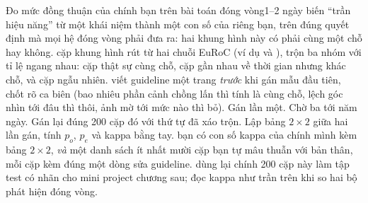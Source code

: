 \documentclass[../../deep_learning.tex]{subfiles}
\begin{document}
\begin{duan}{Đo mức đồng thuận của chính bạn trên bài toán đóng vòng}{1--2 ngày}
\dmt biến ``trần hiệu năng'' từ một khái niệm thành một con số của riêng bạn, trên đúng quyết định mà mọi hệ đóng vòng phải đưa ra: hai khung hình này có phải cùng một chỗ hay không.
 cặp khung hình rút từ hai chuỗi EuRoC (ví dụ  và ), trộn ba nhóm với tỉ lệ ngang nhau: cặp thật sự cùng chỗ, cặp gần nhau về thời gian nhưng khác chỗ, và cặp ngẫu nhiên.
\dbc viết guideline một trang \emph{trước} khi gán mẫu đầu tiên, chốt rõ ca biên (bao nhiêu phần cảnh chồng lấn thì tính là cùng chỗ, lệch góc nhìn tới đâu thì thôi, ảnh mờ tới mức nào thì bỏ). Gán lần một. Chờ ba tới năm ngày. Gán lại đúng 200 cặp đó với thứ tự đã xáo trộn. Lập bảng \(2\times2\) giữa hai lần gán, tính \(p_o\), \(p_e\) và kappa bằng tay.
\dxk bạn có con số kappa của chính mình kèm bảng \(2\times2\), \emph{và} một danh sách ít nhất mười cặp bạn tự mâu thuẫn với bản thân, mỗi cặp kèm đúng một dòng sửa guideline.
\dnv {} dùng lại chính 200 cặp này làm tập test có nhãn cho mini project chương sau;  đọc kappa như trần trên khi so hai bộ phát hiện đóng vòng.
\end{duan}

\begin{traloi}
\end{traloi}
\end{document}
